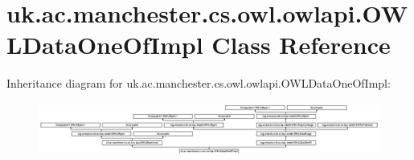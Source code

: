 \hypertarget{classuk_1_1ac_1_1manchester_1_1cs_1_1owl_1_1owlapi_1_1_o_w_l_data_one_of_impl}{\section{uk.\-ac.\-manchester.\-cs.\-owl.\-owlapi.\-O\-W\-L\-Data\-One\-Of\-Impl Class Reference}
\label{classuk_1_1ac_1_1manchester_1_1cs_1_1owl_1_1owlapi_1_1_o_w_l_data_one_of_impl}
}
Inheritance diagram for uk.\-ac.\-manchester.\-cs.\-owl.\-owlapi.\-O\-W\-L\-Data\-One\-Of\-Impl\-:\begin{figure}[H]
\begin{center}
\leavevmode
\includegraphics[height=1.761006cm]{classuk_1_1ac_1_1manchester_1_1cs_1_1owl_1_1owlapi_1_1_o_w_l_data_one_of_impl}
\end{center}
\end{figure}
